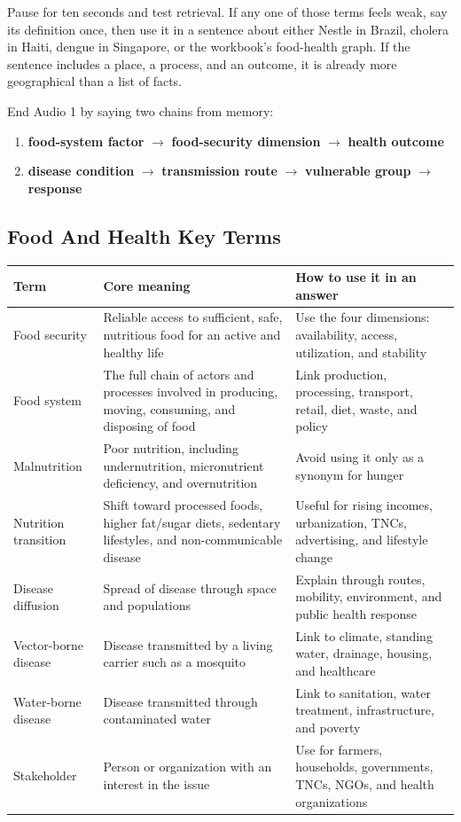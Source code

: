 \documentclass[11pt,a4paper]{article}
\newcommand{\term}[1]{\textcolor{HeadingBlue}{\textbf{#1}}}
\begin{document}
Pause for ten seconds and test retrieval. If any one of those terms feels weak,
say its definition once, then use it in a sentence about either Nestle in Brazil,
cholera in Haiti, dengue in Singapore, or the workbook's food-health graph.
If the sentence includes a place, a process, and an outcome, it is already more
geographical than a list of facts.

End Audio 1 by saying two chains from memory:

\begin{enumerate}
  \item \term{food-system factor} $\rightarrow$ \term{food-security dimension}
  $\rightarrow$ \term{health outcome}
  \item \term{disease condition} $\rightarrow$ \term{transmission route}
  $\rightarrow$ \term{vulnerable group} $\rightarrow$ \term{response}
\end{enumerate}

\subsection{Food And Health Key Terms}

\begin{tabularx}{\textwidth}{L{0.24\textwidth}Y Y}
\toprule
\textbf{Term} & \textbf{Core meaning} & \textbf{How to use it in an answer} \\
\midrule
Food security & Reliable access to sufficient, safe, nutritious food for an
active and healthy life & Use the four dimensions: availability, access,
utilization, and stability \\
Food system & The full chain of actors and processes involved in producing,
moving, consuming, and disposing of food & Link production, processing,
transport, retail, diet, waste, and policy \\
Malnutrition & Poor nutrition, including undernutrition, micronutrient
deficiency, and overnutrition & Avoid using it only as a synonym for hunger \\
Nutrition transition & Shift toward processed foods, higher fat/sugar diets,
sedentary lifestyles, and non-communicable disease & Useful for rising incomes,
urbanization, TNCs, advertising, and lifestyle change \\
Disease diffusion & Spread of disease through space and populations & Explain
through routes, mobility, environment, and public health response \\
Vector-borne disease & Disease transmitted by a living carrier such as a
mosquito & Link to climate, standing water, drainage, housing, and healthcare \\
Water-borne disease & Disease transmitted through contaminated water & Link to
sanitation, water treatment, infrastructure, and poverty \\
Stakeholder & Person or organization with an interest in the issue & Use for
farmers, households, governments, TNCs, NGOs, and health organizations \\
\bottomrule
\end{tabularx}
\end{document}
